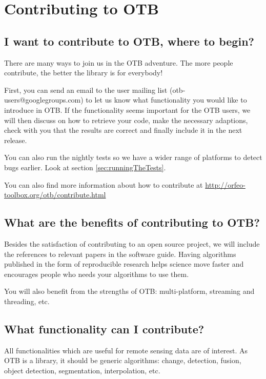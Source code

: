 \section{Contributing to OTB}\label{sec:contributing}

\subsection{I want to contribute to OTB, where to begin?}

There are many ways to join us in the OTB adventure. The more people
contribute, the better the library is for everybody!

First, you can send an email to the user mailing list (otb-users@googlegroups.com)
to let us know what functionality
you would like to introduce in OTB. If the functionality seems important for the
OTB users, we will then discuss on how to retrieve your code,
make the necessary adaptions, check with you that the results are correct and finally
include it in the next release.

You can also run the nightly tests so we have a wider range of platforms to detect
bugs earlier. Look at section \ref{sec:runningTheTests}.

You can also find more information about how to contribute at \url{http://orfeo-toolbox.org/otb/contribute.html}

\subsection{What are the benefits of contributing to OTB?}

Besides the satisfaction of contributing to an open source project, we will include
the references to relevant papers in the software guide. Having algorithms
published in the form of reproducible research helps science move faster and
encourages people who needs your algorithms to use them.

You will also benefit from the strengths of OTB: multi-platform, streaming and
threading, etc.

\subsection{What functionality can I contribute?}

All functionalities which are useful for remote sensing data are of interest. As
OTB is a library, it should be generic algorithms: change, detection, fusion,
object detection, segmentation, interpolation, etc.

